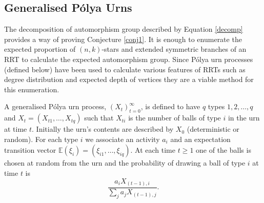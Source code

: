 \documentclass[12pt]{article} %
\theoremstyle{definition}
\begin{document}
\subsection{Generalised P\'{o}lya Urns}\label{Gen}
The decomposition of automorphism group described by Equation \ref{decomp} provides a way of proving Conjecture \ref{conj1}. It is enough to enumerate the expected proportion of $(n,k)$-stars and extended symmetric branches of an RRT to calculate the expected automorphism group.  Since P\'{o}lya urn processes (defined below) have been used to calculate various features of RRTs such as degree distribution and expected depth of vertices they are a viable method for this enumeration.  
 
 A generalised P\'{o}lya urn process, $(X_{t})_{t=0}^{\infty}$, is defined to have $q$ types $1,2,\dots,q$ and $X_{t} = (X_{t1},\dots,X_{tq})$ such that $X_{ti}$ is the number of balls of type $i$ in the urn at time $t$.  Initially the urn's contents are described by $X_{0}$ (deterministic or random).  For each type $i$ we associate an activity $a_{i}$ and an expectation transition vector $\mathbb{E}(\xi_{i}) = (\xi_{i1},\dots,\xi_{iq})$.  At each time $t\geq 1$ one of the balls is chosen at random from the urn and the probability of drawing a ball of type $i$ at time $t$ is 
 \[                                                                                                                                                                                                                                                                                                                                                                                                                                                                                                                                                                                   \frac{a_{i}X_{(t-1),i}}{\sum_{j}a_{j}X_{(t-1),j}}.
 \]                                                                                                                                                                                                                                                                                                                                                                                                                                                                                                                                                                                                                                                                                                                                                                                                                                                                                                                                                                                                                                                             
\end{document}
